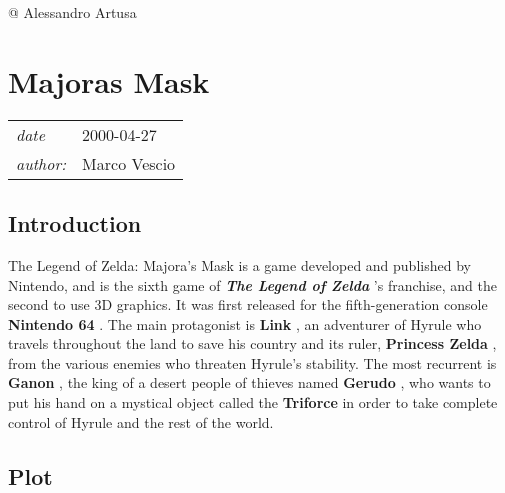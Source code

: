\documentclass[a4paper,10pt]{book}
\newcommand{\pageHeader}[4]{
    \section{#1}
    \vspace{-0.3cm}
    \begin{table}[h!]
     \begin{tabular}{ll}
        \hline
        \textit{date} & #2 \\
        \textit{author: } & #3\\
        \hline
     \end{tabular}
    \end{table}
    \vspace{-0.3cm}
}
\begin{document}
 
 @ Alessandro Artusa 
 
 \newpage\pageHeader{Majoras Mask}{2000-04-27}{Marco Vescio}{A webpage about Majora's Mask}
 \subsection{Introduction }
 
          The Legend of Zelda: Majora's Mask is a game developed and published by Nintendo, and is the sixth game of  \textbf{\textit{The Legend of Zelda }} 's franchise, and the second to use 3D graphics.
          It was first released for the fifth-generation console  \textbf{Nintendo 64 } . The main protagonist is  \textbf{Link } , an adventurer of Hyrule who travels throughout the land to save his country
          and its ruler,  \textbf{Princess Zelda } , from the various enemies who threaten Hyrule's stability. The most recurrent is  \textbf{Ganon } , the king of a desert people of thieves named  \textbf{Gerudo } ,
          who wants to put his hand on a mystical object called the  \textbf{Triforce }  in order to take complete control of Hyrule and the rest of the world.
         
 \subsection{Plot }
 
\end{document}
